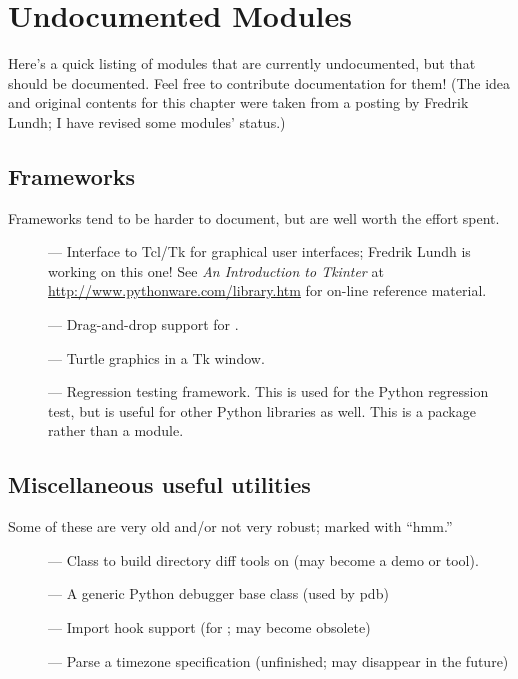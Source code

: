 \chapter{Undocumented Modules}
\label{undoc}

Here's a quick listing of modules that are currently undocumented, but
that should be documented.  Feel free to contribute documentation for
them!  (The idea and original contents for this chapter were taken
from a posting by Fredrik Lundh; I have revised some modules' status.)


\section{Frameworks}

Frameworks tend to be harder to document, but are well worth the
effort spent.

\begin{description}
\item[]
--- Interface to Tcl/Tk for graphical user interfaces;
Fredrik Lundh is working on this one!  See \emph{An Introduction to
Tkinter} at \url{http://www.pythonware.com/library.htm} for on-line
reference material.

\item[]
--- Drag-and-drop support for .

\item[]
--- Turtle graphics in a Tk window.

\item[]
--- Regression testing framework.  This is used for the Python
regression test, but is useful for other Python libraries as well.
This is a package rather than a module.
\end{description}


\section{Miscellaneous useful utilities}

Some of these are very old and/or not very robust; marked with ``hmm.''

\begin{description}
\item[]
--- Class to build directory diff tools on (may become a demo or tool).

\item[]
--- A generic Python debugger base class (used by pdb)

\item[]
--- Import hook support (for ; may become obsolete)

\item[]
--- Parse a timezone specification (unfinished; may disappear in the
future)
\end{description}



